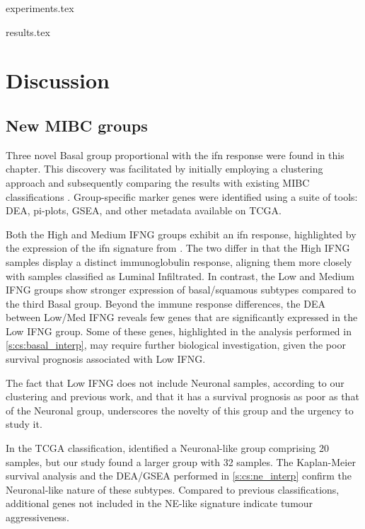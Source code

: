 
{experiments.tex}

{results.tex}

\section{Discussion} \label{s:cs:discussion}

\subsection*{New MIBC groups}

Three novel Basal group proportional with the \acrfull{ifn} response were found in this chapter. This discovery was facilitated by initially employing a  clustering approach and subsequently comparing the results with existing MIBC classifications \citet{Baker2022-bj,Marzouka2018-ge}. Group-specific marker genes were identified using a suite of tools: DEA, pi-plots, GSEA, and other metadata available on TCGA.

Both the High and Medium IFNG groups exhibit an \acrshort{ifn} response, highlighted by the expression of the \acrshort{ifn} signature from \citet{Baker2022-bj}. The two differ in that the High IFNG samples display a distinct immunoglobulin response, aligning them more closely with samples classified as Luminal Infiltrated. In contrast, the Low and Medium IFNG groups show stronger expression of basal/squamous subtypes compared to the third Basal group. Beyond the immune response differences, the DEA between Low/Med IFNG reveals few genes that are significantly expressed in the Low IFNG group. Some of these genes, highlighted in the analysis performed in \cref{s:cs:basal_interp}, may require further biological investigation, given the poor survival prognosis associated with Low IFNG.

The fact that Low IFNG does not include Neuronal samples, according to our clustering and previous work, and that it has a survival prognosis as poor as that of the Neuronal group, underscores the novelty of this group and the urgency to study it.

In the TCGA classification, \citet{Robertson2017-mg} identified a Neuronal-like group comprising 20 samples, but our study found a larger group with 32 samples. The Kaplan-Meier survival analysis and the DEA/GSEA performed in \cref{s:cs:ne_interp} confirm the Neuronal-like nature of these subtypes. Compared to previous classifications, additional genes not included in the NE-like signature indicate tumour aggressiveness.

